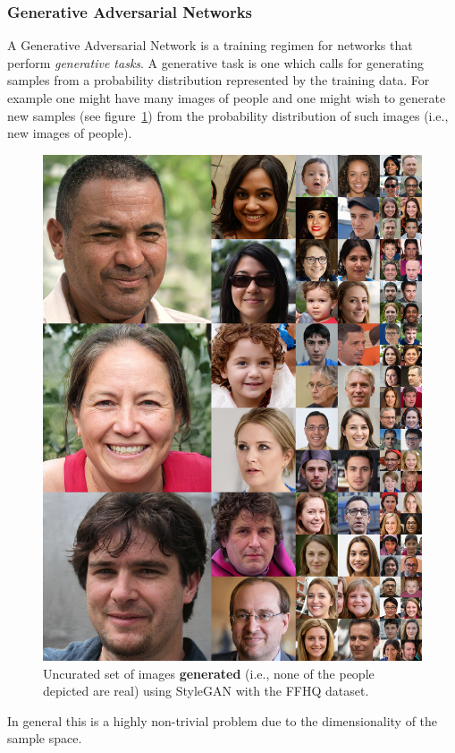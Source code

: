 \subsubsection{Generative Adversarial Networks}\label{subsubsec:gan}
A Generative Adversarial Network\cite{goodfellow2014generative} is a training regimen for networks that perform \textit{generative tasks}.
%
A generative task is one which calls for generating samples from a probability distribution represented by the training data.
%
For example one might have many images of people and one might wish to generate new samples (see figure~\ref{fig:stylegan}) from the probability distribution of such images (i.e., new images of people).
\begin{figure}
    \centering
    \begin{adjustbox}{width=\linewidth}
        \centering
        \includegraphics[]{figures/neural_networks/stylegan.jpg}
    \end{adjustbox}
    \caption{Uncurated set of images \textbf{generated} (i.e., none of the people depicted are real) using StyleGAN with the FFHQ dataset\cite{karras2018stylebased}.}\label{fig:stylegan}
\end{figure}
%
In general this is a highly non-trivial problem due to the dimensionality of the sample space.

